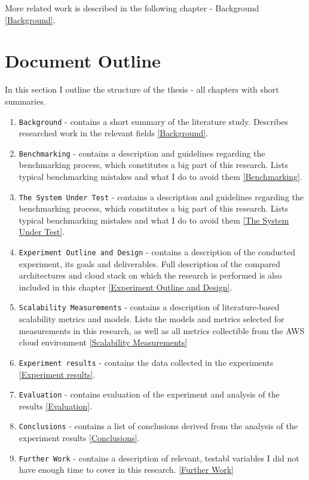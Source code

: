 \documentclass{uvamscse}
\begin{document}
More related work is described in the following chapter - Background \ref{Background}.

\section{Document Outline}
In this section I outline the structure of the thesis - all chapters with short summaries.

\begin{enumerate}
  \item \texttt{Background} - contains a short summary of the literature study. Describes researched work in the relevant fields \ref{Background}.
  \item \texttt{Benchmarking} - contains a description and guidelines regarding the benchmarking process, which constitutes a big part of this research. Lists typical benchmarking mistakes and what I do to avoid them \ref{Benchmarking}.
  \item \texttt{The System Under Test} - contains a description and guidelines regarding the benchmarking process, which constitutes a big part of this research. Lists typical benchmarking mistakes and what I do to avoid them \ref{The System Under Test}.
  \item \texttt{Experiment Outline and Design} - contains a description of the conducted experiment, its goals and deliverables. Full description of the compared architectures and cloud stack on which the research is performed is also included in this chapter \ref{Experiment Outline and Design}.
  \item \texttt{Scalability Measurements} - contains a description of literature-based scalability metrics and models. Lists the models and metrics selected for measurements in this research, as well as all metrics collectible from the AWS cloud environment \ref{Scalability Measurements}
  \item \texttt{Experiment results} - contains the data collected in the experiments \ref{Experiment results}.
  \item \texttt{Evaluation} - contains evaluation of the experiment and analysis of the results \ref{Evaluation}.
  \item \texttt{Conclusions} - contains a list of conclusions derived from the analysis of the experiment results \ref{Conclusions}.
  \item \texttt{Further Work} - contains a description of relevant, testabl variables I did not have enough time to cover in this research. \ref{Further Work}
\end{enumerate}
\end{document}

